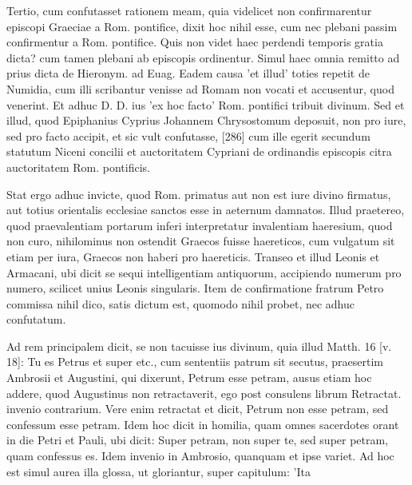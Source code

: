 Tertio, cum confutasset rationem meam, quia videlicet non confirmarentur episcopi Graeciae a Rom. pontifice, dixit hoc nihil esse, cum nec plebani passim confirmentur a Rom. pontifice. Quis non videt haec perdendi temporis gratia dicta? cum tamen plebani ab episcopis ordinentur. Simul haec omnia remitto ad prius dicta de Hieronym. ad Euag. Eadem causa 'et illud' toties repetit de Numidia, cum illi scribantur venisse ad Romam non vocati et accusentur, quod venerint. Et adhuc D. D. ius 'ex hoc facto' Rom. pontifici tribuit divinum. Sed et illud, quod Epiphanius Cyprius Johannem Chrysostomum deposuit, non pro iure, sed pro facto accipit, et sic vult confutasse, [286] cum ille egerit secundum statutum Niceni concilii et auctoritatem Cypriani de ordinandis episcopis citra auctoritatem Rom. pontificis.

Stat ergo adhuc invicte, quod Rom. primatus aut non est iure divino firmatus, aut totius orientalis ecclesiae sanctos esse in aeternum damnatos. Illud praetereo, quod praevalentiam portarum inferi interpretatur invalentiam haeresium, quod non curo, nihilominus non ostendit Graecos fuisse haereticos, cum vulgatum sit etiam per iura, Graecos non haberi pro haereticis. Transeo et illud Leonis et Armacani, ubi dicit se sequi intelligentiam antiquorum, accipiendo numerum pro numero, scilicet unius Leonis singularis. Item de confirmatione fratrum Petro commissa nihil dico, satis dictum est, quomodo nihil probet, nec adhuc confutatum.

Ad rem principalem dicit, se non tacuisse ius divinum, quia illud Matth. 16 [v. 18]: Tu es Petrus et super etc., cum sententiis patrum sit secutus, praesertim Ambrosii et Augustini, qui dixerunt, Petrum esse petram, ausus etiam hoc addere, quod Augustinus non retractaverit, ego post consulens librum Retractat. invenio contrarium. Vere enim retractat et dicit, Petrum non esse petram, sed confessum esse petram. Idem hoc dicit in homilia, quam omnes sacerdotes orant in die Petri et Pauli, ubi dicit: Super petram, non super te, sed super petram, quam confessus es. Idem invenio in Ambrosio, quanquam et ipse variet. Ad hoc est simul aurea illa glossa, ut gloriantur, super capitulum: 'Ita

